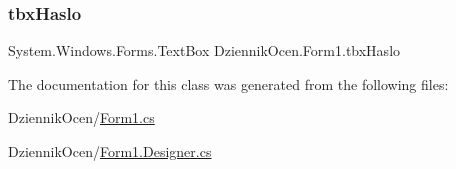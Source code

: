 \mbox{\label{class_dziennik_ocen_1_1_form1_ae78ef2ccf550d5af060ea54cbc28077f}} 
\subsubsection{\texorpdfstring{tbx\+Haslo}{tbxHaslo}}
{\footnotesize\ttfamily System.\+Windows.\+Forms.\+Text\+Box Dziennik\+Ocen.\+Form1.\+tbx\+Haslo\hspace{0.3cm}{\ttfamily [private]}}



The documentation for this class was generated from the following files\+:\begin{DoxyCompactItemize}
\item 
Dziennik\+Ocen/\hyperlink{_form1_8cs}{Form1.\+cs}\item 
Dziennik\+Ocen/\hyperlink{_form1_8_designer_8cs}{Form1.\+Designer.\+cs}\end{DoxyCompactItemize}
